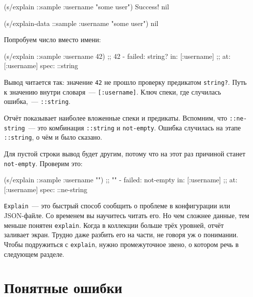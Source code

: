 \begin{english}
  \begin{clojure}
(s/explain ::sample {:username "some user"})
Success!
nil

(s/explain-data ::sample {:username "some user"})
nil
  \end{clojure}
\end{english}

\fi

\noindent
Попробуем число вместо имени:

\begin{english}
  \begin{clojure}
(s/explain ::sample {:username 42})
;; 42 - failed: string? in: [:username]
;; at: [:username] spec: ::string
  \end{clojure}
\end{english}

Вывод читается так: значение \verb|42| не прошло проверку предикатом
\verb|string?|. Путь к значению внутри словаря~--- \verb|[:username]|. Ключ
спеки, где случилась ошибка,~--- \verb|::string|.

Отчёт показывает наиболее вложенные спеки и предикаты. Вспомним, что
\verb|::ne-string|~--- это комбинация \verb|::string| и
\verb|not-empty|. Ошибка случилась на этапе \verb|::string|, о чём и было
сказано.

Для пустой строки вывод будет другим, потому что на этот раз причиной станет
\verb|not-empty|. Проверим это:

\begin{english}
  \begin{clojure}
(s/explain ::sample {:username ""})
;; "" - failed: not-empty in: [:username]
;; at: [:username] spec: ::ne-string
  \end{clojure}
\end{english}

\verb|Explain|~--- это быстрый способ сообщить о проблеме в конфигурации или
JSON-файле. Со временем вы научитесь читать его. Но чем сложнее данные, тем
меньше понятен \verb|explain|. Когда в коллекции больше трёх уровней,
отчёт заливает экран. Трудно даже разбить его на части, не говоря уж о
понимании. Чтобы подружиться с \verb|explain|, нужно промежуточное звено, о
котором речь в следующем разделе.

\section{Понятные ошибки}

